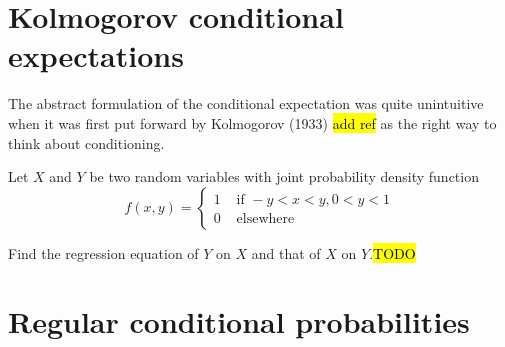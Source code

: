 \section{Kolmogorov conditional expectations}

The abstract formulation of the conditional expectation was quite
unintuitive when it was first put forward by Kolmogorov (1933) \hl{add ref}
as the right way to think about conditioning.
\begin{example}
\label{exa:isi2005samplepsb11}Let $X$ and $Y$ be two random variables
with joint probability density function 
\[
f(x,y)=\begin{cases}
1 & \text{ if }-y<x<y,0<y<1\\
0 & \text{ elsewhere }
\end{cases}
\]

Find the regression equation of $Y$ on $X$ and that of $X$ on $Y$.\hl{TODO}
\end{example}


\section{Regular conditional probabilities}
